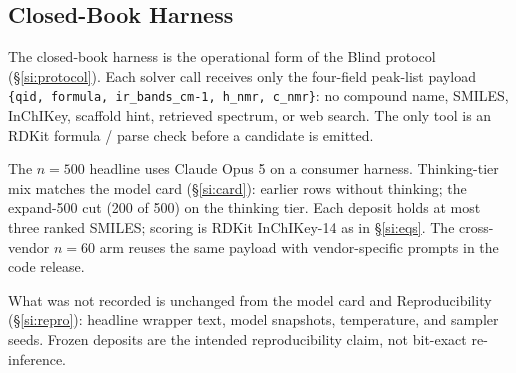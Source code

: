 \subsection{Closed-Book Harness}
\label{si:closed-book}

The closed-book harness is the operational form of the Blind protocol
(\S\ref{si:protocol}).
Each solver call receives only the four-field peak-list payload
\texttt{\{qid, formula, ir\_bands\_cm-1, h\_nmr, c\_nmr\}}:
no compound name, SMILES, InChIKey, scaffold hint, retrieved spectrum, or web search.
The only tool is an RDKit formula / parse check before a candidate is emitted.

The $n{=}500$ headline uses Claude Opus 5 on a consumer harness.
Thinking-tier mix matches the model card (\S\ref{si:card}): earlier rows
without thinking; the expand-500 cut (200 of 500) on the thinking tier.
Each deposit holds at most three ranked SMILES; scoring is RDKit InChIKey-14
as in \S\ref{si:eqs}.
The cross-vendor $n{=}60$ arm reuses the same payload with vendor-specific
prompts in the code release.

What was not recorded is unchanged from the model card and Reproducibility
(\S\ref{si:repro}): headline wrapper text, model snapshots, temperature, and
sampler seeds.
Frozen deposits are the intended reproducibility claim, not bit-exact
re-inference.
